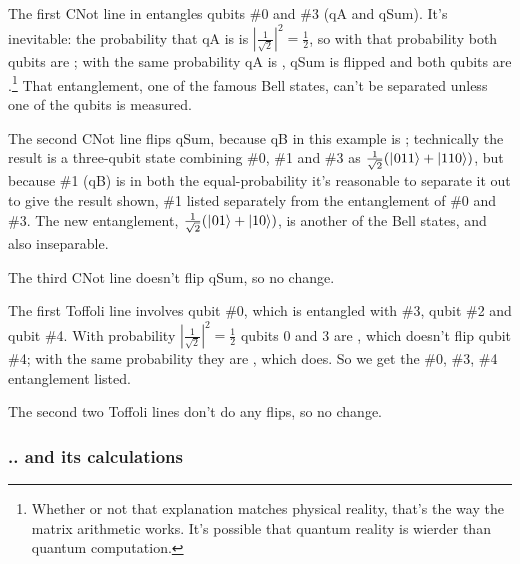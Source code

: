 \documentclass[11pt,a4paper]{book}
\begin{document}
The first CNot line in  entangles qubits \#0 and \#3 (qA and qSum). It's inevitable: the probability that qA is \zero{} is $|\frac{1}{\sqrt2}|^{2}=\frac{1}{2}$, so with that probability both qubits are \zero{}; with the same probability qA is \one{}, qSum is flipped and both qubits are \one{}.\footnote{Whether or not that explanation matches physical reality, that's the way the matrix arithmetic works. It's possible that quantum reality is wierder than quantum computation.} That entanglement, one of the famous Bell states, can't be separated unless one of the qubits is measured.

The second CNot line flips qSum, because qB in this example is \one{}; technically the result is a three-qubit state combining \#0, \#1 and \#3 as $\frac{1}{\sqrt2}(|\hspace{0.5pt}011\rangle+|110\rangle)$, but because \#1 (qB) is \one{} in both the equal-probability it's reasonable to separate it out to give the result shown, \#1 listed separately from the entanglement of \#0 and \#3. The new entanglement, $\frac{1}{\sqrt2}(|\hspace{0.5pt}01\rangle+|10\rangle)$, is another of the Bell states, and also inseparable.

The third CNot line doesn't flip qSum, so no change.

The first Toffoli line involves qubit \#0, which is entangled with \#3, qubit \#2 and qubit \#4. With probability $|\frac{1}{\sqrt2}|^{2}=\frac{1}{2}$ qubits 0 and 3 are \zeroone, which doesn't flip qubit \#4; with the same probability they are \onezero{}, which does. So we get the \#0, \#3, \#4 entanglement listed.

The second two Toffoli lines don't do any flips, so no change. 

\subsubsection{.. and its calculations}
\end{document}
